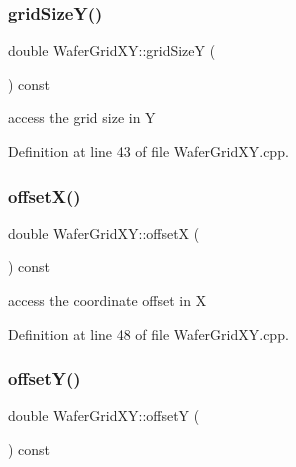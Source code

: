 \subsubsection{\texorpdfstring{grid\+Size\+Y()}{gridSizeY()}}
{\footnotesize\ttfamily double Wafer\+Grid\+X\+Y\+::grid\+SizeY (\begin{DoxyParamCaption}{ }\end{DoxyParamCaption}) const}



access the grid size in Y 



Definition at line 43 of file Wafer\+Grid\+X\+Y.\+cpp.

\hypertarget{class_d_d4hep_1_1_geometry_1_1_wafer_grid_x_y_a5d167f1d6c861c027eaecf8079f3d89d}{}\label{class_d_d4hep_1_1_geometry_1_1_wafer_grid_x_y_a5d167f1d6c861c027eaecf8079f3d89d} 
\subsubsection{\texorpdfstring{offset\+X()}{offsetX()}}
{\footnotesize\ttfamily double Wafer\+Grid\+X\+Y\+::offsetX (\begin{DoxyParamCaption}{ }\end{DoxyParamCaption}) const}



access the coordinate offset in X 



Definition at line 48 of file Wafer\+Grid\+X\+Y.\+cpp.

\hypertarget{class_d_d4hep_1_1_geometry_1_1_wafer_grid_x_y_a798ebe4f6079a63a05987148f5c61edb}{}\label{class_d_d4hep_1_1_geometry_1_1_wafer_grid_x_y_a798ebe4f6079a63a05987148f5c61edb} 
\subsubsection{\texorpdfstring{offset\+Y()}{offsetY()}}
{\footnotesize\ttfamily double Wafer\+Grid\+X\+Y\+::offsetY (\begin{DoxyParamCaption}{ }\end{DoxyParamCaption}) const}



